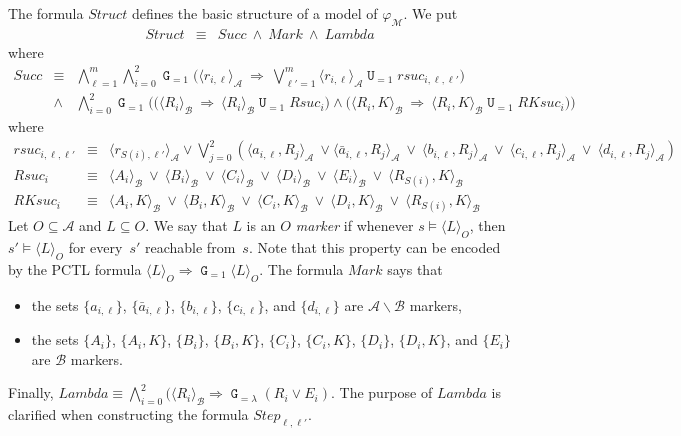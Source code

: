 \documentclass[a4paper,UKenglish,cleveref, autoref, thm-restate]{lipics-v2021}
\newcommand{\A}{\mathcal{A}}
\newcommand{\B}{\mathcal{B}}
\newcommand{\M}{\mathcal{M}}
\newcommand{\ex}[1]{\langle #1 \rangle}
\newcommand{\Step}{\mathit{Step}}
\newcommand{\Succ}{\mathit{Succ}}
\newcommand{\Struct}{\textit{Struct}}
\newcommand{\rSuc}{\textit{rsuc}}
\newcommand{\RSuc}{\textit{Rsuc}}
\newcommand{\RKSuc}{\textit{RKsuc}}
\newcommand{\Mark}{\textit{Mark}}
\newcommand{\FLambda}{\textit{Lambda}}
\newcommand*{\opu}{\operatorname{\pmb{\mathtt{U}}}}
\newcommand*{\opg}{\operatorname{\pmb{\mathtt{G}}}}
\begin{document}
The formula $\Struct$ defines the basic structure of a model of $\varphi_\M$.  We put 
\begin{eqnarray*}
  \Struct & \equiv & \Succ \ \wedge \ \Mark \ \wedge\ \FLambda
\end{eqnarray*}
where
\begin{eqnarray*}
    \Succ & \equiv & \bigwedge_{\ell=1}^m \bigwedge_{i=0}^2 \opg_{=1} \bigg(  \ex{r_{i,\ell}}_{\A} \ \Rightarrow \ \bigvee_{\ell'=1}^m \ex{r_{i,\ell}}_{\A} \opu_{=1} \rSuc_{i,\ell,\ell'} \bigg)\\ 
       & \wedge & \bigwedge_{i=0}^2 \opg_{=1} \bigg(
       \big( \ex{R_i}_{\B} \ \Rightarrow \ \ex{R_i}_{\B} \opu_{=1} \RSuc_i \big) 
       \wedge
       \big( \ex{R_i,K}_{\B} \ \Rightarrow \ \ex{R_i,K}_{\B} \opu_{=1} \RKSuc_i \big) 
       \bigg)
\end{eqnarray*}
where
{\small
\begin{eqnarray*}
    \rSuc_{i,\ell,\ell'} & \equiv & \ex{r_{S(i),\ell'}}_{\A} \vee \bigvee_{j=0}^2 \left(\ex{a_{i,\ell},R_j}_{\A} \ \vee \ex{\bar{a}_{i,\ell},R_j}_{\A}\ \vee \ \ex{b_{i,\ell}, R_j}_{\A} \ \vee \ \ex{c_{i,\ell},R_j}_{\A} \ \vee \ \ex{d_{i,\ell},R_j}_{\A}\right)  \\
    \RSuc_i & \equiv & \ex{A_i}_{\B} \ \vee \ \ex{B_i}_{\B} \ \vee \ \ex{C_i}_{\B} \ \vee \ \ex{D_i}_{\B} \ \vee \ \ex{E_i}_{\B} \ \vee \ \ex{R_{S(i)},K}_{\B}\\
    \RKSuc_i & \equiv & \ex{A_i,K}_{\B} \ \vee \ \ex{B_i,K}_{\B} \ \vee \ \ex{C_i,K}_{\B} \ \vee \ \ex{D_i,K}_{\B}  \ \vee \ \ex{R_{S(i)},K}_{\B}
\end{eqnarray*}}Let $O \subseteq \A$ and $L \subseteq O$. We say that $L$ is an \emph{$O$ marker} if whenever $s \models \ex{L}_O$, then $s' \models \ex{L}_O$ for every~$s'$ reachable from~$s$. Note that this property can be encoded by the PCTL formula $\ex{L}_O \Rightarrow \opg_{=1} \ex{L}_O$. The formula $\Mark$ says that
\begin{itemize}
    \item the sets $\{a_{i,\ell}\}$, $\{\bar{a}_{i,\ell}\}$, $\{b_{i,\ell}\}$, $\{c_{i,\ell}\}$, and $\{d_{i,\ell}\}$ are $\A \smallsetminus \B$ markers,
    \item the sets $\{A_i\}$, $\{A_i,K\}$, $\{B_i\}$, $\{B_i,K\}$, $\{C_i\}$, $\{C_i,K\}$, $\{D_i\}$, $\{D_i,K\}$, and $\{E_i\}$ are $\B$ markers.
\end{itemize} 
Finally, $\FLambda \equiv \bigwedge_{i=0}^2 (\ex{R_i}_{\B} \Rightarrow \opg_{=\lambda}(R_i {\vee} E_i)$.
The purpose of $\FLambda$ is clarified when constructing the formula $\Step_{\ell,\ell'}$. 
\end{document}
